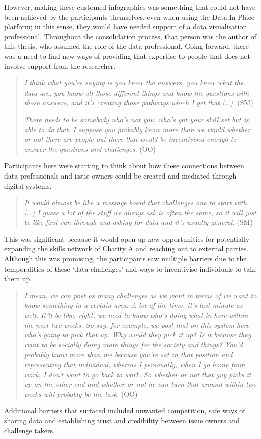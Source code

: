 However, making these customed infographics was something that could not have been achieved by the participants themselves, even when using the Data:In Place platform; in this sense, they would have needed support of a data visualisation professional. Throughout the consolidation process, that person was the author of this thesis, who assumed the role of the data professional. Going forward, there was a need to find new ways of providing that expertise to people that does not involve support from the researcher.
\begin{quote}
   \textit{I think what you're saying is you know the answers, you know what the data are, you know all those different things and know the questions with those answers, and it's creating those pathways which I get that [...].} (SM)
    
    \textit{There needs to be somebody who's not you, who's got your skill set but is able to do that. I suppose you probably know more than we would whether or not there are people out there that would be incentivised enough to answer the questions and challenges.} (OO)
\end{quote}
Participants here were starting to think about how these connections between data professionals and issue owners could be created and mediated through digital systems.
\begin{quote}
    \textit{It would almost be like a message board that challenges one to start with. [...] I guess a lot of the stuff we always ask is often the same, so it will just be like first run through and asking for data and it's usually general.} (SM)
\end{quote}
This was significant because it would open up new opportunities for potentially expanding the skills network of Charity A and reaching out to external parties. Although this was promising, the participants saw multiple barriers due to the temporalities of these `data challenges' and ways to incentivise individuals to take them up.

\begin{quote}
    \textit{I mean, we can post as many challenges as we want in terms of we want to know something in a certain area. A lot of the time, it's last minute as well. It'll be like, right, we need to know who's doing what in here within the next two weeks. So say, for example, we post that on this system here who's going to pick that up. Why would they pick it up? Is it because they want to be socially doing more things for the society and things? You'd probably know more than me because you're sat in that position and representing that individual, whereas I personally, when I go home from work, I don't want to go back to work. So whether or not that guy picks it up on the other end and whether or not he can turn that around within two weeks will probably be the task.} (OO)
\end{quote}
Additional barriers that surfaced included unwanted competition, safe ways of sharing data and establishing trust and credibility between issue owners and challenge takers.


